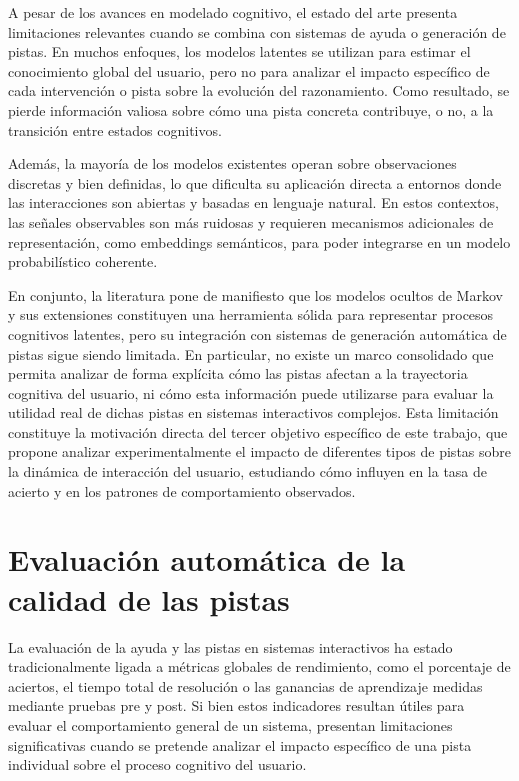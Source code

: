 \documentclass[../main.tex]{subfiles}
\begin{document}
A pesar de los avances en modelado cognitivo, el estado del arte presenta limitaciones relevantes cuando se combina con sistemas de ayuda o generación de pistas. En muchos enfoques, los modelos latentes se utilizan para estimar el conocimiento global del usuario, pero no para analizar el impacto específico de cada intervención o pista sobre la evolución del razonamiento. Como resultado, se pierde información valiosa sobre cómo una pista concreta contribuye, o no, a la transición entre estados cognitivos.

Además, la mayoría de los modelos existentes operan sobre observaciones discretas y bien definidas, lo que dificulta su aplicación directa a entornos donde las interacciones son abiertas y basadas en lenguaje natural. En estos contextos, las señales observables son más ruidosas y requieren mecanismos adicionales de representación, como embeddings semánticos, para poder integrarse en un modelo probabilístico coherente.

En conjunto, la literatura pone de manifiesto que los modelos ocultos de Markov y sus extensiones constituyen una herramienta sólida para representar procesos cognitivos latentes, pero su integración con sistemas de generación automática de pistas sigue siendo limitada. En particular, no existe un marco consolidado que permita analizar de forma explícita cómo las pistas afectan a la trayectoria cognitiva del usuario, ni cómo esta información puede utilizarse para evaluar la utilidad real de dichas pistas en sistemas interactivos complejos. Esta limitación constituye la motivación directa del tercer objetivo específico de este trabajo, que propone analizar experimentalmente el impacto de diferentes tipos de pistas sobre la dinámica de interacción del usuario, estudiando cómo influyen en la tasa de acierto y en los patrones de comportamiento observados.

\section{Evaluación automática de la calidad de las pistas}

La evaluación de la ayuda y las pistas en sistemas interactivos ha estado tradicionalmente ligada a métricas globales de rendimiento, como el porcentaje de aciertos, el tiempo total de resolución o las ganancias de aprendizaje medidas mediante pruebas pre y post. Si bien estos indicadores resultan útiles para evaluar el comportamiento general de un sistema, presentan limitaciones significativas cuando se pretende analizar el impacto específico de una pista individual sobre el proceso cognitivo del usuario.
\end{document}
